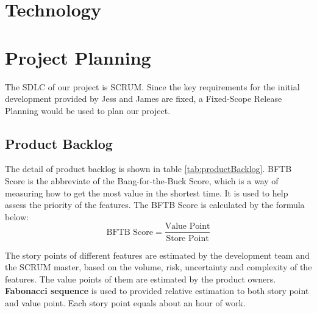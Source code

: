 \documentclass{report}
\begin{document}
\section{Technology}
\section{Project Planning}
The SDLC of our project is SCRUM. Since the key requirements for the initial development provided by Jess and James are fixed, a Fixed-Scope Release Planning would be used to plan our project.

\subsection{Product Backlog}
The detail of product backlog is shown in table \ref{tab:productBacklog}. BFTB Score is the abbreviate of the Bang-for-the-Buck Score, which is a way of measuring how to get the most value in the shortest time. It is used to help assess the priority of the features. The BFTB Score is calculated by the formula below:
$$
  \text{BFTB Score} = \frac{\text{Value Point}}{\text{Store Point}}
$$

The story points of different features are estimated by the development team and the SCRUM master, based on the volume, risk, uncertainty and complexity of the features. The value points of them are estimated by the product owners. \textbf{Fabonacci sequence} is used to provided relative estimation to both story point and value point. Each story point equals about an hour of work.
\end{document}
